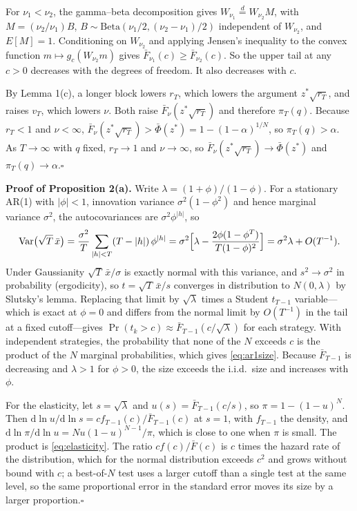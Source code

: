 For $\nu_1<\nu_2$, the gamma--beta decomposition gives $W_{\nu_1}\overset{d}{=}W_{\nu_2}M$, with $M=(\nu_2/\nu_1)B$, $B\sim\mathrm{Beta}(\nu_1/2,(\nu_2-\nu_1)/2)$ independent of $W_{\nu_2}$, and $E[M]=1$. Conditioning on $W_{\nu_2}$ and applying Jensen's inequality to the convex function $m\mapsto g_c(W_{\nu_2}m)$ gives $\bar F_{\nu_1}(c)\ge\bar F_{\nu_2}(c)$. So the upper tail at any $c>0$ decreases with the degrees of freedom. It also decreases with $c$.

By Lemma 1(c), a longer block lowers $r_T$, which lowers the argument $z^*\sqrt{r_T}$, and raises $v_T$, which lowers $\nu$. Both raise $\bar F_\nu(z^*\sqrt{r_T})$ and therefore $\pi_T(q)$. Because $r_T<1$ and $\nu<\infty$, $\bar F_\nu(z^*\sqrt{r_T})>\bar\Phi(z^*)=1-(1-\alpha)^{1/N}$, so $\pi_T(q)>\alpha$. As $T\to\infty$ with $q$ fixed, $r_T\to1$ and $\nu\to\infty$, so $\bar F_\nu(z^*\sqrt{r_T})\to\bar\Phi(z^*)$ and $\pi_T(q)\to\alpha$.\hfill$\square$

\medskip\noindent\textbf{Proof of Proposition 2(a).} Write $\lambda=(1+\phi)/(1-\phi)$. For a stationary AR(1) with $|\phi|<1$, innovation variance $\sigma^2(1-\phi^2)$ and hence marginal variance $\sigma^2$, the autocovariances are $\sigma^2\phi^{|h|}$, so
\[
\operatorname{Var}\bigl(\sqrt T\,\bar x\bigr)=\frac{\sigma^2}{T}\sum_{|h|<T}(T-|h|)\,\phi^{|h|}=\sigma^2\Bigl[\lambda-\frac{2\phi(1-\phi^{T})}{T(1-\phi)^2}\Bigr]=\sigma^2\lambda+O(T^{-1}).
\]
Under Gaussianity $\sqrt T\,\bar x/\sigma$ is exactly normal with this variance, and $s^2\to\sigma^2$ in probability (ergodicity), so $t=\sqrt T\,\bar x/s$ converges in distribution to $N(0,\lambda)$ by Slutsky's lemma. Replacing that limit by $\sqrt\lambda$ times a Student $t_{T-1}$ variable---which is exact at $\phi=0$ and differs from the normal limit by $O(T^{-1})$ in the tail at a fixed cutoff---gives $\Pr(t_k>c)\approx\bar F_{T-1}(c/\sqrt\lambda)$ for each strategy. With independent strategies, the probability that none of the $N$ exceeds $c$ is the product of the $N$ marginal probabilities, which gives \eqref{eq:ar1size}. Because $\bar F_{T-1}$ is decreasing and $\lambda>1$ for $\phi>0$, the size exceeds the i.i.d.\ size and increases with $\phi$.

For the elasticity, let $s=\sqrt\lambda$ and $u(s)=\bar F_{T-1}(c/s)$, so $\pi=1-(1-u)^N$. Then $\mathrm d\ln u/\mathrm d\ln s=c f_{T-1}(c)/\bar F_{T-1}(c)$ at $s=1$, with $f_{T-1}$ the density, and $\mathrm d\ln\pi/\mathrm d\ln u=Nu(1-u)^{N-1}/\pi$, which is close to one when $\pi$ is small. The product is \eqref{eq:elasticity}. The ratio $c f(c)/\bar F(c)$ is $c$ times the hazard rate of the distribution, which for the normal distribution exceeds $c^2$ and grows without bound with $c$; a best-of-$N$ test uses a larger cutoff than a single test at the same level, so the same proportional error in the standard error moves its size by a larger proportion.\hfill$\square$

